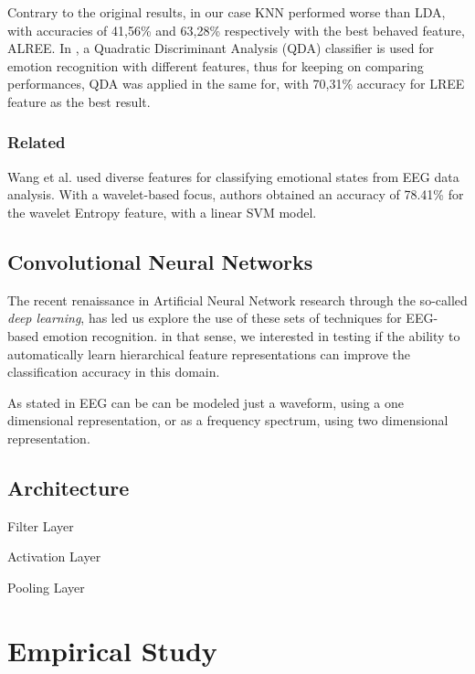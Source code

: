 \documentclass{sig-alternate}
\begin{document}
Contrary to the original results, in our case KNN performed worse than LDA, with accuracies of 41,56\% and 63,28\% respectively with the best behaved feature, ALREE. In \cite{jenke2014feature}, a Quadratic Discriminant Analysis (QDA) classifier is used for emotion recognition with different features, thus for keeping on comparing performances, QDA was applied in the same for, with 70,31\% accuracy for LREE feature as the best result.

\subsubsection{Related}
Wang et al. \cite{wang2014} used diverse features for classifying emotional states from EEG data analysis. With a wavelet-based focus, authors obtained an accuracy of 78.41\% for the wavelet Entropy feature, with a linear SVM model.



\subsection{Convolutional Neural Networks}

The recent renaissance in Artificial Neural Network research 
through the so-called \emph{deep learning}, has led us explore 
the use of these sets of techniques for EEG-based emotion 
recognition. in that sense, we interested in testing if the ability
to automatically learn  hierarchical feature representations can
improve the classification accuracy in this domain. 

As stated in \cite{stober2014using} EEG can be can be modeled 
just a waveform, using a one
dimensional representation, or as a frequency spectrum, using 
two dimensional representation.

\subsection{Architecture}

Filter Layer 

Activation Layer
 
Pooling Layer



\cite{lecun1995convolutional}
\cite{zheng2014time}

\cite{stober2014classifying}
\cite{xing2010brief}

\section{Empirical Study}
\label{study}
\end{document}
